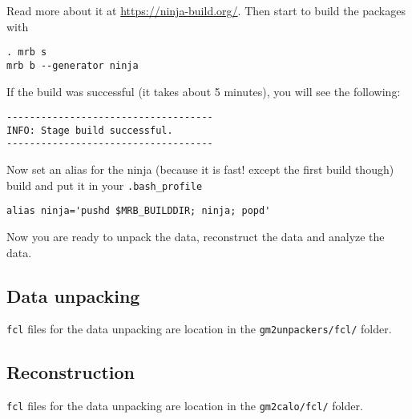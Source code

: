 %
Read more about it at \url{https://ninja-build.org/}.
Then start to build the packages with
%
\begin{Verbatim}[frame=single]
. mrb s
mrb b --generator ninja
\end{Verbatim}
%
If the build was successful (it takes about 5 minutes), you will see the following:
%
\begin{Verbatim}[frame=single]
------------------------------------
INFO: Stage build successful.
------------------------------------
\end{Verbatim}
%
Now set an alias for the ninja (because it is fast! except the first build though) build and put it in your \verb+.bash_profile+
%
\begin{Verbatim}[frame=single]
alias ninja='pushd $MRB_BUILDDIR; ninja; popd'
\end{Verbatim}
%
Now you are ready to unpack the data, reconstruct the data and analyze the data.

\subsection{Data unpacking}

\verb+fcl+ files for the data unpacking are location in the \verb+gm2unpackers/fcl/+ folder.

\subsection{Reconstruction}

\verb+fcl+ files for the data unpacking are location in the \verb+gm2calo/fcl/+ folder.
